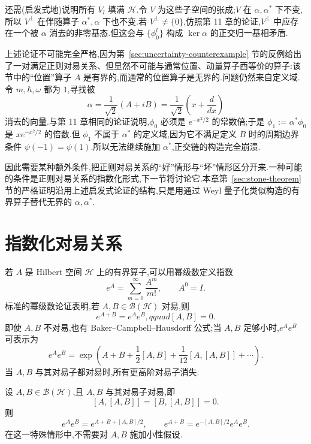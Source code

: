 还需(启发式地)说明所有 $V_l$ 填满 $\mathcal H$.令 $V$ 为这些子空间的张成;$V$ 在 $\alpha,\alpha^*$ 下不变,所以 $V^\perp$ 在伴随算子 $\alpha^*,\alpha$ 下也不变.若 $V^\perp\neq\{0\}$,仿照第 11 章的论证,$V^\perp$ 中应存在一个被 $\alpha$ 消去的非零基态.但这会与 $\{\phi_0^l\}$ 构成 $\ker\alpha$ 的正交归一基相矛盾.

上述论证不可能完全严格,因为第~\ref{sec:uncertainty-counterexample} 节的反例给出了一对满足正则对易关系、但显然不可能与通常位置、动量算子酉等价的算子:该节中的“位置”算子 $A$ 是有界的,而通常的位置算子是无界的.问题仍然来自定义域.令 $m,\hbar,\omega$ 都为 $1$,寻找被
\[
\alpha=\frac1{\sqrt2}\left(A+iB\right)=\frac1{\sqrt2}\left(x+\frac{d}{dx}\right)
\]
消去的向量.与第 11 章相同的论证说明,$\phi_0$ 必须是 $e^{-x^2/2}$ 的常数倍;于是 $\phi_1:=\alpha^*\phi_0$ 是 $xe^{-x^2/2}$ 的倍数.但 $\phi_1$ 不属于 $\alpha^*$ 的定义域,因为它不满足定义 $B$ 时的周期边界条件 $\psi(-1)=\psi(1)$.所以无法继续施加 $\alpha^*$,正交链的构造完全崩溃.

因此需要某种额外条件,把正则对易关系的“好”情形与“坏”情形区分开来.一种可能的条件是正则对易关系的指数化形式,下一节将讨论它.本章第~\ref{sec:stone-theorem} 节的严格证明沿用上述启发式论证的结构,只是用通过 Weyl 量子化类似构造的有界算子替代无界的 $\alpha,\alpha^*$.

\section{指数化对易关系}
\label{sec:exponentiated-commutation}

若 $A$ 是 Hilbert 空间 $\mathcal H$ 上的有界算子,可以用幂级数定义指数
\[
e^A=\sum_{m=0}^{\infty}\frac{A^m}{m!},\qquad A^0=I.
\]
标准的幂级数论证表明,若 $A,B\in\mathcal B(\mathcal H)$ 对易,则
\[
e^{A+B}=e^Ae^B,qquad [A,B]=0.
\label{eq:exp-commuting}
\]
即使 $A,B$ 不对易,也有 Baker--Campbell--Hausdorff 公式;当 $A,B$ 足够小时,$e^Ae^B$ 可表示为
\[
e^Ae^B=\exp\left(A+B+\frac12[A,B]+\frac1{12}[A,[A,B]]+\cdots\right).
\]
当 $A,B$ 与其对易子都对易时,所有更高阶对易子消失.

\begin{theorem}\label{thm:bch-special}
设 $A,B\in\mathcal B(\mathcal H)$,且 $A,B$ 与其对易子对易,即
\[
[A,[A,B]]=[B,[A,B]]=0.
\]
则
\[
e^Ae^B=e^{A+B+[A,B]/2},
\qquad
e^{A+B}=e^{-[A,B]/2}e^Ae^B.
\]
在这一特殊情形中,不需要对 $A,B$ 施加小性假设.
\end{theorem}

